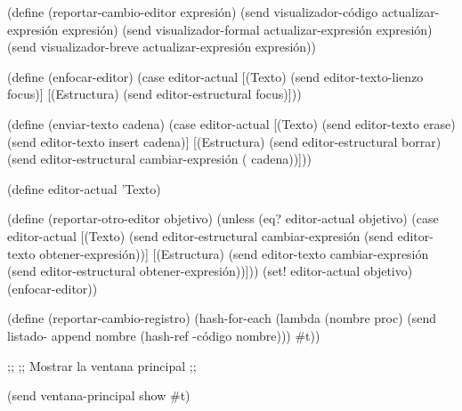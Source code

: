 \documentclass[letterpaper, twoside, openright, 11pt]{book}%
\begin{document}
{{{{{{{{{{{{{{{{{(define (reportar-cambio-editor expresión)
  (send visualizador-código actualizar-expresión expresión)
  (send visualizador-formal actualizar-expresión expresión)
  (send visualizador-breve actualizar-expresión expresión))

(define (enfocar-editor)
  (case editor-actual
    [(Texto)
     (send editor-texto-lienzo focus)]
    [(Estructura)
     (send editor-estructural focus)]))

(define (enviar-texto cadena)
  (case editor-actual
    [(Texto)
     (send editor-texto erase)
     (send editor-texto insert cadena)]
    [(Estructura)
     (send editor-estructural borrar)
     (send editor-estructural cambiar-expresión
           ( cadena))]))

(define editor-actual 'Texto)

(define (reportar-otro-editor objetivo)
  (unless (eq? editor-actual objetivo)
    (case editor-actual
      [(Texto)
       (send editor-estructural cambiar-expresión
             (send editor-texto obtener-expresión))]
      [(Estructura)
       (send editor-texto cambiar-expresión
             (send editor-estructural obtener-expresión))]))
  (set! editor-actual objetivo)
  (enfocar-editor))

(define (reportar-cambio-registro)
  (hash-for-each 
                 (lambda (nombre proc)
                   (send listado- append
                         nombre (hash-ref -código nombre)))
                 #t))

;;
;; Mostrar la ventana principal
;;

(send ventana-principal show #t)

}}}}}}}}}}}}}}}}}
\end{document}
